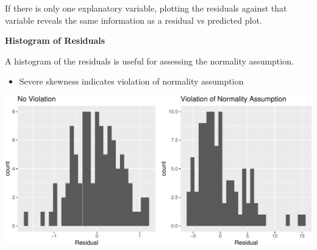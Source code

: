 \documentclass[
  letterpaper,
  DIV=11,
  numbers=noendperiod]{scrreprt}
\newenvironment{Shaded}{\begin{snugshade}}{\end{snugshade}}
\newcommand{\AttributeTok}[1]{\textcolor[rgb]{0.40,0.45,0.13}{#1}}
\newcommand{\DecValTok}[1]{\textcolor[rgb]{0.68,0.00,0.00}{#1}}
\newcommand{\FunctionTok}[1]{\textcolor[rgb]{0.28,0.35,0.67}{#1}}
\newcommand{\NormalTok}[1]{\textcolor[rgb]{0.00,0.23,0.31}{#1}}
\newcommand{\OtherTok}[1]{\textcolor[rgb]{0.00,0.23,0.31}{#1}}
\newcommand{\SpecialCharTok}[1]{\textcolor[rgb]{0.37,0.37,0.37}{#1}}
\newcommand{\StringTok}[1]{\textcolor[rgb]{0.13,0.47,0.30}{#1}}
\providecommand{\tightlist}{%
  \setlength{\itemsep}{0pt}\setlength{\parskip}{0pt}}\usepackage{longtable,booktabs,array}
\begin{document}
If there is only one explanatory variable, plotting the residuals
against that variable reveals the same information as a residual vs
predicted plot.

\textbf{Histogram of Residuals}

A histogram of the residuals is useful for assessing the normality
assumption.

\begin{itemize}
\tightlist
\item
  Severe skewness indicates violation of normality assumption
\end{itemize}

\begin{Shaded}
\end{Shaded}

\includegraphics{Ch5_files/figure-pdf/unnamed-chunk-6-1.pdf}
\end{document}
